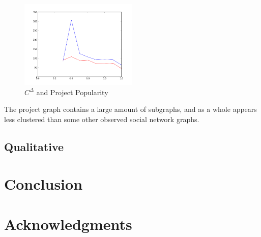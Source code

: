 \documentclass{proc}
\begin{document}
\begin{figure}
\begin{center}
\caption{$C^\Delta$ and Project Popularity}
\includegraphics[width=0.5\textwidth]{images/freecode-graph.png}
\end{center}
\end{figure}

The project graph contains a large amount of subgraphs, and as a whole appears less clustered than some other observed social network graphs\cite{madey2002open}.

\subsection{Qualitative}

\section{Conclusion}


\section{Acknowledgments}



\end{document}
